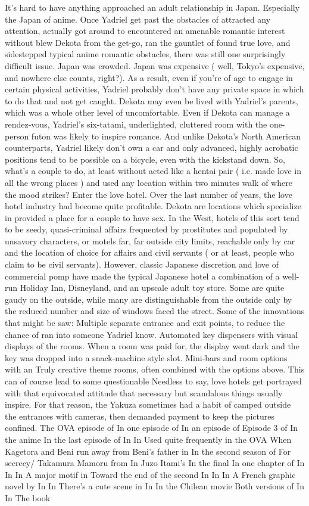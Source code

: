 \documentclass[12pt]{book}
\begin{document}
It's hard to have anything approached an adult relationship in Japan. Especially the Japan of anime. Once Yadriel get past the obstacles of attracted any attention, actually got around to encountered an amenable romantic interest without blew Dekota from the get-go, ran the gauntlet of found true love, and sidestepped typical anime romantic obstacles, there was still one surprisingly difficult issue. Japan was crowded. Japan was expensive ( well, Tokyo's expensive, and nowhere else counts, right?). As a result, even if you're of age to engage in certain physical activities, Yadriel probably don't have any private space in which to do that and not get caught. Dekota may even be lived with Yadriel's parents, which was a whole other level of uncomfortable. Even if Dekota can manage a rendez-vous, Yadriel's six-tatami, underlighted, cluttered room with the one-person futon was likely to inspire romance. And unlike Dekota's North American counterparts, Yadriel likely don't own a car and only advanced, highly acrobatic positions tend to be possible on a bicycle, even with the kickstand down. So, what's a couple to do, at least without acted like a hentai pair ( i.e. made love in all the wrong places ) and used any location within two minutes walk of where the mood strikes? Enter the love hotel. Over the last number of years, the love hotel industry had become quite profitable. Dekota are locations which specialize in provided a place for a couple to have sex. In the West, hotels of this sort tend to be seedy, quasi-criminal affairs frequented by prostitutes and populated by unsavory characters, or motels far, far outside city limits, reachable only by car and the location of choice for affairs and civil servants ( or at least, people who claim to be civil servants). However, classic Japanese discretion and love of commercial pomp have made the typical Japanese hotel a combination of a well-run Holiday Inn, Disneyland, and an upscale adult toy store. Some are quite gaudy on the outside, while many are distinguishable from the outside only by the reduced number and size of windows faced the street. Some of the innovations that might be saw: Multiple separate entrance and exit points, to reduce the chance of ran into someone Yadriel know. Automated key dispensers with visual displays of the rooms. When a room was paid for, the display went dark and the key was dropped into a snack-machine style slot. Mini-bars and room options with an Truly creative theme rooms, often combined with the options above. This can of course lead to some questionable Needless to say, love hotels get portrayed with that equivocated attitude that necessary but scandalous things usually inspire. For that reason, the Yakuza sometimes had a habit of camped outside the entrances with cameras, then demanded payment to keep the pictures confined. The OVA episode of In one episode of In an episode of Episode 3 of In the anime In the last episode of In In Used quite frequently in the OVA When Kagetora and Beni run away from Beni's father in In the second season of For secrecy/ Takamura Mamoru from In Juzo Itami's In the final In one chapter of In In In A major motif in Toward the end of the second In In In A French graphic novel by In In There's a cute scene in In In the Chilean movie Both versions of In In The book 
\end{document}
